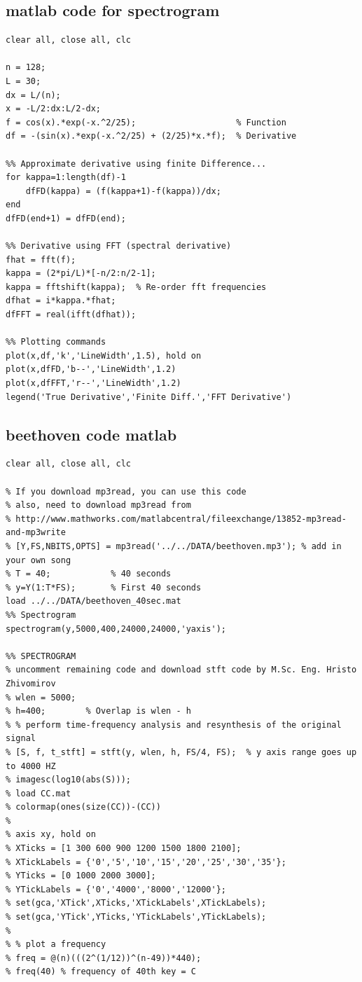 \documentclass[11pt]{article}
\begin{document}
\subsection{matlab code for spectrogram}
\label{sec:orgc220ed6}
\begin{verbatim}
clear all, close all, clc

n = 128;
L = 30;
dx = L/(n);
x = -L/2:dx:L/2-dx;
f = cos(x).*exp(-x.^2/25);                    % Function
df = -(sin(x).*exp(-x.^2/25) + (2/25)*x.*f);  % Derivative

%% Approximate derivative using finite Difference...
for kappa=1:length(df)-1
    dfFD(kappa) = (f(kappa+1)-f(kappa))/dx;
end
dfFD(end+1) = dfFD(end);

%% Derivative using FFT (spectral derivative)
fhat = fft(f);
kappa = (2*pi/L)*[-n/2:n/2-1];
kappa = fftshift(kappa);  % Re-order fft frequencies
dfhat = i*kappa.*fhat;
dfFFT = real(ifft(dfhat));

%% Plotting commands
plot(x,df,'k','LineWidth',1.5), hold on
plot(x,dfFD,'b--','LineWidth',1.2)
plot(x,dfFFT,'r--','LineWidth',1.2)
legend('True Derivative','Finite Diff.','FFT Derivative')

\end{verbatim}
\subsection{beethoven code matlab}
\label{sec:org6280a8e}
\begin{verbatim}
clear all, close all, clc

% If you download mp3read, you can use this code
% also, need to download mp3read from 
% http://www.mathworks.com/matlabcentral/fileexchange/13852-mp3read-and-mp3write
% [Y,FS,NBITS,OPTS] = mp3read('../../DATA/beethoven.mp3'); % add in your own song
% T = 40;            % 40 seconds
% y=Y(1:T*FS);       % First 40 seconds
load ../../DATA/beethoven_40sec.mat 
%% Spectrogram
spectrogram(y,5000,400,24000,24000,'yaxis');

%% SPECTROGRAM 
% uncomment remaining code and download stft code by M.Sc. Eng. Hristo Zhivomirov
% wlen = 5000;
% h=400;        % Overlap is wlen - h
% % perform time-frequency analysis and resynthesis of the original signal
% [S, f, t_stft] = stft(y, wlen, h, FS/4, FS);  % y axis range goes up to 4000 HZ
% imagesc(log10(abs(S)));
% load CC.mat
% colormap(ones(size(CC))-(CC))
% 
% axis xy, hold on
% XTicks = [1 300 600 900 1200 1500 1800 2100];
% XTickLabels = {'0','5','10','15','20','25','30','35'};
% YTicks = [0 1000 2000 3000];
% YTickLabels = {'0','4000','8000','12000'};
% set(gca,'XTick',XTicks,'XTickLabels',XTickLabels);
% set(gca,'YTick',YTicks,'YTickLabels',YTickLabels);
% 
% % plot a frequency
% freq = @(n)(((2^(1/12))^(n-49))*440);
% freq(40) % frequency of 40th key = C

\end{verbatim}
\end{document}
